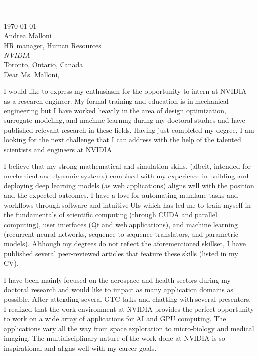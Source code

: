 \documentclass[12pt]{article} %
\begin{document}
\medskip %
\rule[0pt]{\textwidth}{1pt}\\
\today\\[6pt]
Andrea Malloni\\
HR manager, Human Resources\\
\textit{NVIDIA}\\
Toronto, Ontario, Canada\\[6pt] \medskip
Dear Ms. Malloni,

\medskip %
I would like to express my enthusiasm for the opportunity to intern at NVIDIA as a research engineer. My formal training and education is in mechanical engineering but I have worked heavily in the area of design optimization, surrogate modeling, and machine learning during my doctoral studies and have published relevant research in these fields. Having just completed my degree, I am looking for the next challenge that I can address with the help of the talented scientists and engineers at NVIDIA

\medskip %

I believe that my strong mathematical and simulation skills, (albeit, intended for mechanical and dynamic systems) combined with my experience in building and deploying deep learning models (as web applications) aligns well with the position and the expected outcomes. I have a love for automating mundane tasks and workflows through software and intuitive UIs which has led me to train myself in the fundamentals of scientific computing (through CUDA and parallel computing), user interfaces (Qt and web applications), and machine learning (recurrent neural networks, sequence-to-sequence translators, and parametric models). Although my degrees do not reflect the aforementioned skillset, I have published several peer-reviewed articles that feature these skills (listed in my CV).

\medskip %

I have been mainly focused on the aerospace and health sectors during my doctoral research and would like to impact as many application domains as possible. After attending several GTC talks and chatting with several presenters, I realized that the work environment at NVIDIA provides the perfect opportunity to work on a wide array of applications for AI and GPU computing. The applications vary all the way from space exploration to micro-biology and medical imaging. The multidisciplinary nature of the work done at NVIDIA is so inspirational and aligns well with my career goals.
\end{document}
